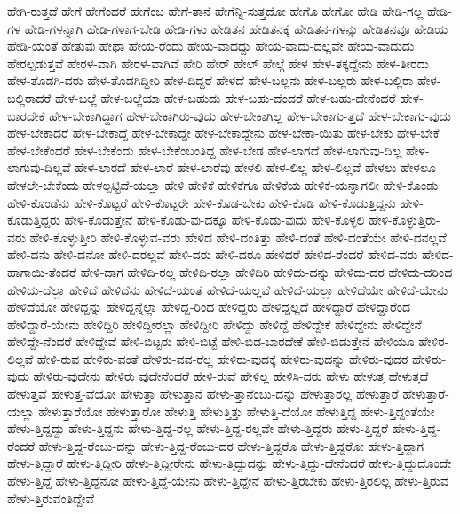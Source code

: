 {ಹೇಗಿ-ರುತ್ತದೆ
ಹೇಗೆ
ಹೇಗೆಂದರೆ
ಹೇಗೆಂಬ
ಹೇಗೆ-ತಾನೆ
ಹೇಗೆನ್ನಿ-ಸುತ್ತದೋ
ಹೇಗೊ
ಹೇಗೋ
ಹೇಡಿ
ಹೇಡಿ-ಗಲ್ಲ
ಹೇಡಿ-ಗಳ
ಹೇಡಿ-ಗಳನ್ನಾಗಿ
ಹೇಡಿ-ಗಳಾಗ-ಬೇಡಿ
ಹೇಡಿ-ಗಳು
ಹೇಡಿತನ
ಹೇಡಿತನಕ್ಕೆ
ಹೇಡಿತನ-ಗಳನ್ನು
ಹೇಡಿತನವೂ
ಹೇಡಿಯ
ಹೇಡಿ-ಯಂತೆ
ಹೇತುವು
ಹೇಥಾ
ಹೇಯ-ರೆಂದು
ಹೇಯ-ವಾದದ್ದು
ಹೇಯ-ವಾದು-ದಲ್ಲವೇ
ಹೇಯ-ವಾದುದು
ಹೇರಲ್ಪಡುತ್ತವೆ
ಹೇರಳ-ವಾಗಿ
ಹೇರಳ-ವಾಗಿವೆ
ಹೇರಿ
ಹೇರ್
ಹೇಲ್
ಹೇಲ್ಗೆ
ಹೇಳ
ಹೇಳ-ತಕ್ಕದ್ದೇನು
ಹೇಳ-ತೀರದು
ಹೇಳ-ತೊಡಗಿ-ದರು
ಹೇಳ-ತೊಡಗಿದ್ದೀರಿ
ಹೇಳ-ದಿದ್ದರೆ
ಹೇಳದೆ
ಹೇಳ-ಬಲ್ಲನು
ಹೇಳ-ಬಲ್ಲರು
ಹೇಳ-ಬಲ್ಲಿರಾ
ಹೇಳ-ಬಲ್ಲಿರಾದರೆ
ಹೇಳ-ಬಲ್ಲೆ
ಹೇಳ-ಬಲ್ಲೆಯಾ
ಹೇಳ-ಬಹುದು
ಹೇಳ-ಬಹು-ದೆಂದರೆ
ಹೇಳ-ಬಹು-ದೇನೆಂದರೆ
ಹೇಳ-ಬಾರದೇಕೆ
ಹೇಳ-ಬೇಕಾಗಿದ್ದಾಗ
ಹೇಳ-ಬೇಕಾಗಿರು-ವುದು
ಹೇಳ-ಬೇಕಾಗಿಲ್ಲ
ಹೇಳ-ಬೇಕಾಗು-ತ್ತದೆ
ಹೇಳ-ಬೇಕಾಗು-ವುದು
ಹೇಳ-ಬೇಕಾದರೆ
ಹೇಳ-ಬೇಕಾದ್ದೆ
ಹೇಳ-ಬೇಕಾದ್ದೇ
ಹೇಳ-ಬೇಕಾದ್ದೇನು
ಹೇಳ-ಬೇಕಾ-ಯಿತು
ಹೇಳ-ಬೇಕು
ಹೇಳ-ಬೇಕೆ
ಹೇಳ-ಬೇಕೆಂದರೆ
ಹೇಳ-ಬೇಕೆಂದು
ಹೇಳ-ಬೇಕೆಂಬಂತಿದ್ದ
ಹೇಳ-ಬೇಡ
ಹೇಳ-ಲಾಗದೆ
ಹೇಳ-ಲಾಗುವು-ದಿಲ್ಲ
ಹೇಳ-ಲಾಗುವು-ದಿಲ್ಲವೆ
ಹೇಳ-ಲಾರದೆ
ಹೇಳ-ಲಾರೆ
ಹೇಳ-ಲಾರೆವು
ಹೇಳಲಿ
ಹೇಳ-ಲಿಲ್ಲ
ಹೇಳ-ಲಿಲ್ಲವೆ
ಹೇಳಲು
ಹೇಳಲೂ
ಹೇಳಲೇ-ಬೇಕೆಂದು
ಹೇಳಲ್ಪಟ್ಟಿದೆ-ಯಲ್ಲಾ
ಹೇಳಿ
ಹೇಳಿಕೆ
ಹೇಳಿಕೆಗೂ
ಹೇಳಿಕೆಯ
ಹೇಳಿಕೆ-ಯನ್ನಾಗಲೀ
ಹೇಳಿ-ಕೊಂಡು
ಹೇಳಿ-ಕೊಂಡೆನು
ಹೇಳಿ-ಕೊಟ್ಟರೆ
ಹೇಳಿ-ಕೊಟ್ಟರೇ
ಹೇಳಿ-ಕೊಡ-ಬೇಕು
ಹೇಳಿ-ಕೊಡಿ
ಹೇಳಿ-ಕೊಡುತ್ತಿದ್ದನು
ಹೇಳಿ-ಕೊಡುತ್ತಿದ್ದರು
ಹೇಳಿ-ಕೊಡುತ್ತೇನೆ
ಹೇಳಿ-ಕೊಡು-ವು-ದಕ್ಕೂ
ಹೇಳಿ-ಕೊಡು-ವುದು
ಹೇಳಿ-ಕೊಳ್ಳಲಿ
ಹೇಳಿ-ಕೊಳ್ಳುತ್ತಿರು-ವರು
ಹೇಳಿ-ಕೊಳ್ಳುತ್ತೀರಿ
ಹೇಳಿ-ಕೊಳ್ಳುವ-ವರು
ಹೇಳಿದ
ಹೇಳಿ-ದಂತಿತ್ತು
ಹೇಳಿ-ದಂತೆ
ಹೇಳಿ-ದಂತೆಯೇ
ಹೇಳಿ-ದನಲ್ಲವೆ
ಹೇಳಿ-ದನು
ಹೇಳಿ-ದನೋ
ಹೇಳಿ-ದರಲ್ಲವೆ
ಹೇಳಿ-ದರು
ಹೇಳಿ-ದರೂ
ಹೇಳಿದರೆ
ಹೇಳಿದ-ರೆಂದರೆ
ಹೇಳಿದ-ವರು
ಹೇಳಿದ-ಹಾಗಾಯಿ-ತೆಂದರೆ
ಹೇಳಿ-ದಾಗ
ಹೇಳಿದಿ-ರಲ್ಲ
ಹೇಳಿದಿ-ರಲ್ಲಾ
ಹೇಳಿದಿರಿ
ಹೇಳಿದು-ದನ್ನು
ಹೇಳಿದು-ದರ
ಹೇಳಿದು-ದರಿಂದ
ಹೇಳಿದು-ದೆಲ್ಲಾ
ಹೇಳಿದೆ
ಹೇಳಿದೆನು
ಹೇಳಿದೆ-ಯಂತೆ
ಹೇಳಿದೆ-ಯಲ್ಲವೆ
ಹೇಳಿದೆ-ಯಲ್ಲಾ
ಹೇಳಿದೆಯೇ
ಹೇಳಿದೆ-ಯೇನು
ಹೇಳಿದೆಯೋ
ಹೇಳಿದ್ದನ್ನು
ಹೇಳಿದ್ದನ್ನೆಲ್ಲಾ
ಹೇಳಿದ್ದ-ರಿಂದ
ಹೇಳಿದ್ದರು
ಹೇಳಿದ್ದಲ್ಲದೆ
ಹೇಳಿದ್ದಾರೆ
ಹೇಳಿದ್ದಾರೆಂದ
ಹೇಳಿದ್ದಾರೆ-ಯೇನು
ಹೇಳಿದ್ದಿರಿ
ಹೇಳಿದ್ದೀರಲ್ಲಾ
ಹೇಳಿದ್ದೀರಿ
ಹೇಳಿದ್ದು
ಹೇಳಿದ್ದೆ
ಹೇಳಿದ್ದೇಕೆ
ಹೇಳಿದ್ದೇನು
ಹೇಳಿದ್ದೇನೆ
ಹೇಳಿದ್ದೇ-ನೆಂದರೆ
ಹೇಳಿದ್ದೇವೆ
ಹೇಳಿ-ಬಿಟ್ಟರು
ಹೇಳಿ-ಬಿಟ್ಟೆ
ಹೇಳಿ-ಬಿಡ-ಬಾರದೇಕೆ
ಹೇಳಿ-ಬಿಡುತ್ತೇನೆ
ಹೇಳಿಯೂ
ಹೇಳಿರ-ಲಿಲ್ಲವೆ
ಹೇಳಿ-ರುವ
ಹೇಳಿರು-ವಂತೆ
ಹೇಳಿರು-ವವ-ರೆಲ್ಲ
ಹೇಳಿರು-ವುದಕ್ಕೆ
ಹೇಳಿರು-ವುದನ್ನು
ಹೇಳಿರು-ವುದರ
ಹೇಳಿರು-ವುದು
ಹೇಳಿರು-ವುದೇನು
ಹೇಳಿರು ವುದೇನೆಂದರೆ
ಹೇಳಿ-ರುವೆ
ಹೇಳಿಲ್ಲ
ಹೇಳಿಸಿ-ದರು
ಹೇಳು
ಹೇಳುತ್ತ
ಹೇಳುತ್ತದೆ
ಹೇಳುತ್ತವೆ
ಹೇಳುತ್ತ-ವೆಯೋ
ಹೇಳುತ್ತಾ
ಹೇಳುತ್ತಾನೆ
ಹೇಳು-ತ್ತಾನೆಂಬು-ದನ್ನು
ಹೇಳುತ್ತಾರಲ್ಲ
ಹೇಳುತ್ತಾರೆ
ಹೇಳುತ್ತಾರೆ-ಯಲ್ಲಾ
ಹೇಳುತ್ತಾರೆಯೋ
ಹೇಳುತ್ತಾರೋ
ಹೇಳುತ್ತಿ
ಹೇಳುತ್ತಿತ್ತು
ಹೇಳುತ್ತಿ-ದೆಯೋ
ಹೇಳುತ್ತಿದ್ದ
ಹೇಳು-ತ್ತಿದ್ದಂತೆಯೇ
ಹೇಳು-ತ್ತಿದ್ದದ್ದು
ಹೇಳು-ತ್ತಿದ್ದನು
ಹೇಳು-ತ್ತಿದ್ದ-ರಲ್ಲ
ಹೇಳು-ತ್ತಿದ್ದ-ರಲ್ಲವೇ
ಹೇಳು-ತ್ತಿದ್ದರು
ಹೇಳು-ತ್ತಿದ್ದರೆ
ಹೇಳು-ತ್ತಿದ್ದ-ರೆಂದರೆ
ಹೇಳು-ತ್ತಿದ್ದ-ರೆಂಬು-ದನ್ನು
ಹೇಳು-ತ್ತಿದ್ದ-ರೆಂಬು-ದರ
ಹೇಳು-ತ್ತಿದ್ದರೊ
ಹೇಳು-ತ್ತಿದ್ದರೋ
ಹೇಳು-ತ್ತಿದ್ದಾಗ
ಹೇಳು-ತ್ತಿದ್ದಾರೆ
ಹೇಳು-ತ್ತಿದ್ದೀರಿ
ಹೇಳು-ತ್ತಿದ್ದೀರೇನು
ಹೇಳು-ತ್ತಿದ್ದುದನ್ನು
ಹೇಳು-ತ್ತಿದ್ದು-ದೇನೆಂದರೆ
ಹೇಳು-ತ್ತಿದ್ದುದೊಂದೇ
ಹೇಳು-ತ್ತಿದ್ದೆ
ಹೇಳು-ತ್ತಿದ್ದೆನೋ
ಹೇಳು-ತ್ತಿದ್ದೆ-ಯೇನು
ಹೇಳು-ತ್ತಿದ್ದೇನೆ
ಹೇಳು-ತ್ತಿರಬೇಕು
ಹೇಳು-ತ್ತಿರಲಿಲ್ಲ
ಹೇಳು-ತ್ತಿರುವ
ಹೇಳು-ತ್ತಿರುವಂತಿದ್ದೇವೆ
}
